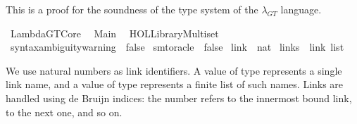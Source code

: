 %
\begin{isabellebody}%
%
%
\isadelimdocument
%
\endisadelimdocument
%
\isatagdocument
%
\isamarkuptrue%
%
\endisatagdocument
{\isafolddocument}%
%
\isadelimdocument
%
\endisadelimdocument
%
\begin{isamarkuptext}%
This is a proof for the soundness of the type system of the $\lambda_{GT}$ language.%
\end{isamarkuptext}\isamarkuptrue%
%
\isadelimtheory
%
\endisadelimtheory
%
\isatagtheory
{}\isamarkupfalse%
\ LambdaGT{\isacharunderscore}{\kern0pt}Core\isanewline
{}\isanewline
\ \ Main\isanewline
\ \ {\isachardoublequoteopen}HOL{\isacharminus}{\kern0pt}Library{\isachardot}{\kern0pt}Multiset{\isachardoublequoteclose}\isanewline
{}%
\endisatagtheory
{\isafoldtheory}%
%
\isadelimtheory
%
\endisadelimtheory
\isanewline
\isanewline
{}\isamarkupfalse%
\ {\isacharbrackleft}{\kern0pt}{\isacharbrackleft}{\kern0pt}syntax{\isacharunderscore}{\kern0pt}ambiguity{\isacharunderscore}{\kern0pt}warning\ {\isacharequal}{\kern0pt}\ false{\isacharbrackright}{\kern0pt}{\isacharbrackright}{\kern0pt}\isanewline
{}\isamarkupfalse%
\ {\isacharbrackleft}{\kern0pt}{\isacharbrackleft}{\kern0pt}smt{\isacharunderscore}{\kern0pt}oracle\ {\isacharequal}{\kern0pt}\ false{\isacharbrackright}{\kern0pt}{\isacharbrackright}{\kern0pt}%
\isadelimdocument
%
\endisadelimdocument
%
\isatagdocument
%
\isamarkuptrue%
%
\isamarkuptrue%
%
\endisatagdocument
{\isafolddocument}%
%
\isadelimdocument
%
\endisadelimdocument
{}\isamarkupfalse%
\ link\ {\isacharequal}{\kern0pt}\ nat\isanewline
{}\isamarkupfalse%
\ links\ {\isacharequal}{\kern0pt}\ {\isachardoublequoteopen}link\ list{\isachardoublequoteclose}%
\begin{isamarkuptext}%
We use natural numbers as link identifiers.
A value of type  represents a single link name,
and a value of type  represents a finite list of such names.
Links are handled using de Bruijn indices: the number  refers to the
innermost bound link,  to the next one, and so on.%
\end{isamarkuptext}\isamarkuptrue%

\end{isabellebody}
